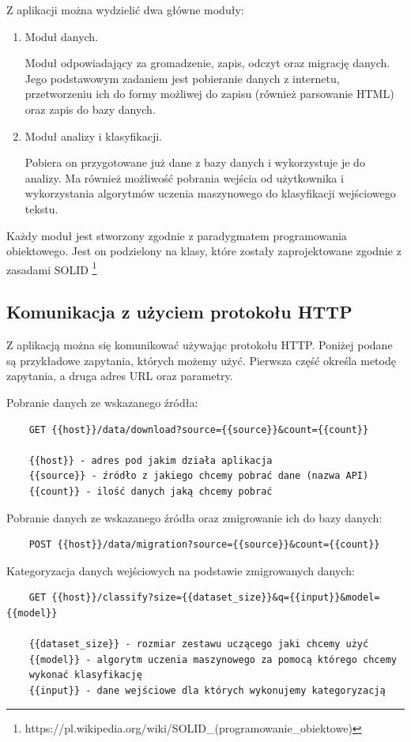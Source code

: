 Z aplikacji można wydzielić dwa główne moduły:
\begin{enumerate}
    \item Moduł danych.
    
    Moduł odpowiadający za gromadzenie, zapis, odczyt oraz migrację danych. Jego podstawowym zadaniem jest pobieranie danych z internetu, przetworzeniu ich do formy możliwej do zapisu (również parsowanie HTML) oraz zapis do bazy danych.
    
    \item Moduł analizy i klasyfikacji.
    
    Pobiera on przygotowane już dane z bazy danych i wykorzystuje je do analizy. Ma również możliwość pobrania wejścia od użytkownika i wykorzystania algorytmów uczenia maszynowego do klasyfikacji wejściowego tekstu.
\end{enumerate}

Każdy moduł jest stworzony zgodnie z paradygmatem programowania obiektowego. Jest on podzielony na klasy, które zostały zaprojektowane zgodnie z zasadami SOLID \footnote{https://pl.wikipedia.org/wiki/SOLID_(programowanie_obiektowe)}

\subsection{Komunikacja z użyciem protokołu HTTP}

Z aplikacją można się komunikować używając protokołu HTTP. Poniżej podane są przykładowe zapytania, których możemy użyć. Pierwsza część określa metodę zapytania, a druga adres URL oraz parametry.

Pobranie danych ze wskazanego źródła:
\begin{verbatim}
    GET {{host}}/data/download?source={{source}}&count={{count}}
    
    {{host}} - adres pod jakim działa aplikacja
    {{source}} - źródło z jakiego chcemy pobrać dane (nazwa API)
    {{count}} - ilość danych jaką chcemy pobrać
\end{verbatim}

Pobranie danych ze wskazanego źródła oraz zmigrowanie ich do bazy danych:
\begin{verbatim}
    POST {{host}}/data/migration?source={{source}}&count={{count}}
\end{verbatim}

Kategoryzacja danych wejściowych na podstawie zmigrowanych danych:
\begin{verbatim}
    GET {{host}}/classify?size={{dataset_size}}&q={{input}}&model={{model}}
    
    {{dataset_size}} - rozmiar zestawu uczącego jaki chcemy użyć
    {{model}} - algorytm uczenia maszynowego za pomocą którego chcemy 
    wykonać klasyfikację
    {{input}} - dane wejściowe dla których wykonujemy kategoryzacją
\end{verbatim}

